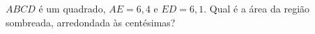 \begin{question}
\begin{instance}
\begin{mcq}[standalone=true]
\begin{stem}
$ABCD$ é um quadrado, $AE=6{,}4$ e $ED=6{,}1$. Qual é a área da região sombreada, arredondada às centésimas?\par
{}
\end{stem}
\begin{distractors}

\end{distractors}

\end{mcq}

\end{instance}

\end{question}
